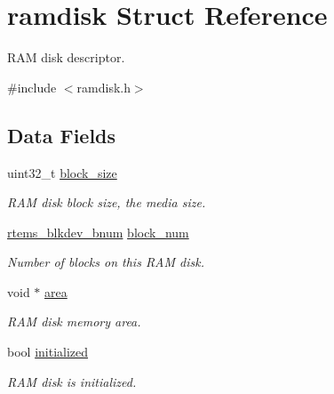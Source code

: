 \hypertarget{structramdisk}{}\section{ramdisk Struct Reference}
\label{structramdisk}


R\+AM disk descriptor.  




{\ttfamily \#include $<$ramdisk.\+h$>$}

\subsection*{Data Fields}
\begin{DoxyCompactItemize}
\item 
\mbox{\label{structramdisk_a30cc31899f3c878e3254027f88159767}} 
uint32\+\_\+t \mbox{\hyperlink{structramdisk_a30cc31899f3c878e3254027f88159767}{block\+\_\+size}}
\begin{DoxyCompactList}\small\item\em R\+AM disk block size, the media size. \end{DoxyCompactList}\item 
\mbox{\label{structramdisk_a1923cc6d05b3795a9924a3e2b575fc89}} 
\mbox{\hyperlink{group__rtems__disk_ga5fbcfd40b657bff6c54d9e393fab3274}{rtems\+\_\+blkdev\+\_\+bnum}} \mbox{\hyperlink{structramdisk_a1923cc6d05b3795a9924a3e2b575fc89}{block\+\_\+num}}
\begin{DoxyCompactList}\small\item\em Number of blocks on this R\+AM disk. \end{DoxyCompactList}\item 
\mbox{\label{structramdisk_af6ced7ec11ab1e2fcacaa2a480928d64}} 
void $\ast$ \mbox{\hyperlink{structramdisk_af6ced7ec11ab1e2fcacaa2a480928d64}{area}}
\begin{DoxyCompactList}\small\item\em R\+AM disk memory area. \end{DoxyCompactList}\item 
\mbox{\label{structramdisk_a6da4d05d48309d8ac0207ab30749911e}} 
bool \mbox{\hyperlink{structramdisk_a6da4d05d48309d8ac0207ab30749911e}{initialized}}
\begin{DoxyCompactList}\small\item\em R\+AM disk is initialized. \end{DoxyCompactList}\item 

\end{DoxyCompactItemize}
